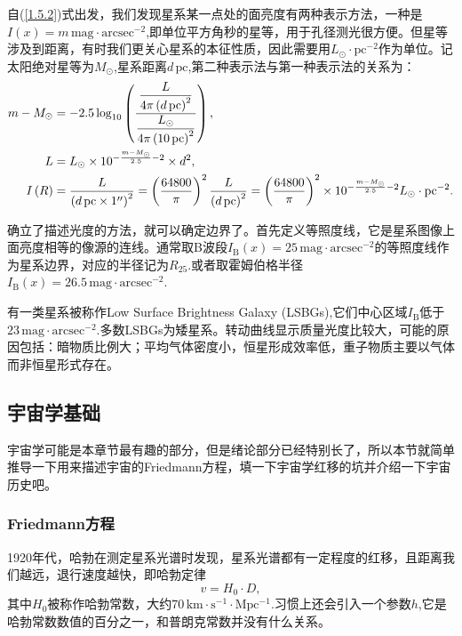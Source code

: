 \documentclass[../天体物理基础.tex]{subfiles}
\begin{document}
自(\ref{1.5.2})式出发，我们发现星系某一点处的面亮度有两种表示方法，一种是$I\left(x\right)=m\,\mathrm{mag\cdot arcsec^{-2}}$,即单位平方角秒的星等，用于孔径测光很方便。但星等涉及到距离，有时我们更关心星系的本征性质，因此需要用$L_{\odot}\cdot\mathrm{pc^{-2}}$作为单位。记太阳绝对星等为$M_{\odot}$,星系距离$d\,\mathrm{pc}$,第二种表示法与第一种表示法的关系为：
\begin{align}
m-M_{\odot}&=-2.5\log_{10}\left(\frac{\dfrac{L}{4\pi\left(d\,\mathrm{pc}\right)^{2}}}{\dfrac{L_{\odot}}{4\pi\left(10\,\mathrm{pc}\right)^{2}}}\right),\notag\\
L&=L_{\odot}\times10^{-\frac{m-M_{\odot}}{2.5}-2}\times d^{2},\notag\\
I\left(R\right)&=\frac{L}{\left(d\,\mathrm{pc}\times1^{\prime\prime}\right)^{2}}=\left(\frac{64800}{\pi}\right)^{2}\frac{L}{\left(d\,\mathrm{pc}\right)^{2}}=\left(\frac{64800}{\pi}\right)^{2}\times10^{-\frac{m-M_{\odot}}{2.5}-2}L_{\odot}\cdot\mathrm{pc}^{-2}.
\end{align}

确立了描述光度的方法，就可以确定边界了。首先定义等照度线，它是星系图像上面亮度相等的像源的连线。通常取B波段$I_{\text{B}}(x)=25\,\mathrm{mag\cdot arcsec^{-2}}$的等照度线作为星系边界，对应的半径记为$R_{25}$.或者取霍姆伯格半径$I_{\text{B}}(x)=26.5\,\mathrm{mag\cdot arcsec^{-2}}$.

有一类星系被称作Low Surface Brightness Galaxy (LSBGs),它们中心区域$I_{\text{B}}$低于$23\,\mathrm{mag\cdot arcsec^{-2}}$.多数LSBGs为矮星系。转动曲线显示质量光度比较大，可能的原因包括：暗物质比例大；平均气体密度小，恒星形成效率低，重子物质主要以气体而非恒星形式存在。

\subsection{宇宙学基础}
宇宙学可能是本章节最有趣的部分，但是绪论部分已经特别长了，所以本节就简单推导一下用来描述宇宙的Friedmann方程，填一下宇宙学红移的坑并介绍一下宇宙历史吧。

\subsubsection{Friedmann方程}
1920年代，哈勃在测定星系光谱时发现，星系光谱都有一定程度的红移，且距离我们越远，退行速度越快，即哈勃定律
\begin{equation}
v=H_{0}\cdot D,
\end{equation}
其中$H_{0}$被称作哈勃常数，大约$70\,\mathrm{km\cdot{}s^{-1}\cdot Mpc^{-1}}$.习惯上还会引入一个参数$h$,它是哈勃常数数值的百分之一，和普朗克常数并没有什么关系。
\end{document}
